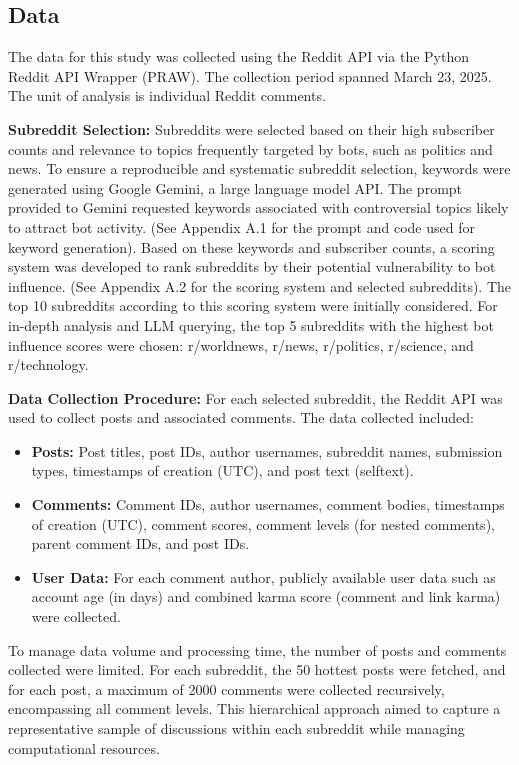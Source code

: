\documentclass[
  12pt,
  letterpaper,
  DIV=11,
  numbers=noendperiod]{scrartcl}
\providecommand{\tightlist}{%
  \setlength{\itemsep}{0pt}\setlength{\parskip}{0pt}}\usepackage{longtable,booktabs,array}
\begin{document}
\subsection{Data}\label{data}

The data for this study was collected using the Reddit API via the
Python Reddit API Wrapper (PRAW). The collection period spanned March
23, 2025. The unit of analysis is individual Reddit comments.

\textbf{Subreddit Selection:} Subreddits were selected based on their
high subscriber counts and relevance to topics frequently targeted by
bots, such as politics and news. To ensure a reproducible and systematic
subreddit selection, keywords were generated using Google Gemini, a
large language model API. The prompt provided to Gemini requested
keywords associated with controversial topics likely to attract bot
activity. (See Appendix A.1 for the prompt and code used for keyword
generation). Based on these keywords and subscriber counts, a scoring
system was developed to rank subreddits by their potential vulnerability
to bot influence. (See Appendix A.2 for the scoring system and selected
subreddits). The top 10 subreddits according to this scoring system were
initially considered. For in-depth analysis and LLM querying, the top 5
subreddits with the highest bot influence scores were chosen:
r/worldnews, r/news, r/politics, r/science, and r/technology.

\textbf{Data Collection Procedure:} For each selected subreddit, the
Reddit API was used to collect posts and associated comments. The data
collected included:

\begin{itemize}
\tightlist
\item
  \textbf{Posts:} Post titles, post IDs, author usernames, subreddit
  names, submission types, timestamps of creation (UTC), and post text
  (selftext).
\item
  \textbf{Comments:} Comment IDs, author usernames, comment bodies,
  timestamps of creation (UTC), comment scores, comment levels (for
  nested comments), parent comment IDs, and post IDs.
\item
  \textbf{User Data:} For each comment author, publicly available user
  data such as account age (in days) and combined karma score (comment
  and link karma) were collected.
\end{itemize}

To manage data volume and processing time, the number of posts and
comments collected were limited. For each subreddit, the 50 hottest
posts were fetched, and for each post, a maximum of 2000 comments were
collected recursively, encompassing all comment levels. This
hierarchical approach aimed to capture a representative sample of
discussions within each subreddit while managing computational
resources.
\end{document}

